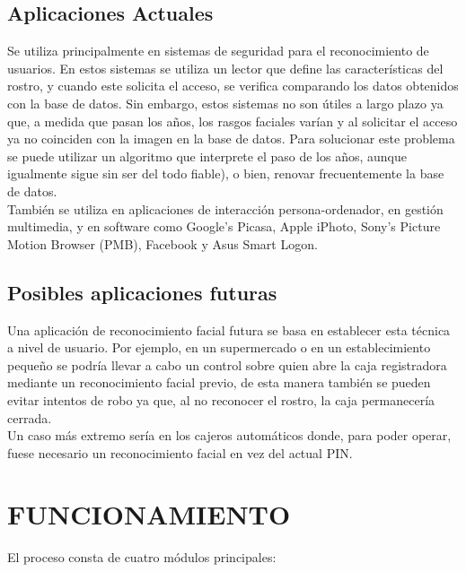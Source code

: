 \documentclass[a4paper,11pt]{article}
\begin{document}
 \subsection{Aplicaciones Actuales}
 Se utiliza principalmente en sistemas de seguridad para el reconocimiento de usuarios. En estos sistemas se utiliza un lector que define las características del rostro, y cuando este solicita el acceso, se verifica comparando los datos obtenidos con la base de datos. Sin embargo, estos sistemas no son útiles a largo plazo ya que, a medida que pasan los años, los rasgos faciales varían y al solicitar el acceso ya no coinciden con la imagen en la base de datos. Para solucionar este problema se puede utilizar un algoritmo que interprete el paso de los años, aunque igualmente sigue sin ser del todo fiable), o bien, renovar frecuentemente la base de datos.	\\
 
 También se utiliza en aplicaciones de interacción persona-ordenador, en gestión multimedia, y en software como Google's Picasa, Apple iPhoto, Sony's Picture Motion Browser (PMB), Facebook y Asus Smart Logon.	\\
 \subsection{Posibles aplicaciones futuras}
 Una aplicación de reconocimiento facial futura se basa en establecer esta técnica a nivel de usuario. Por ejemplo, en un supermercado o en un establecimiento pequeño se podría llevar a cabo un control sobre quien abre la caja registradora mediante un reconocimiento facial previo, de esta manera también se pueden evitar intentos de robo ya que, al no reconocer el rostro, la caja permanecería cerrada. \\Un caso más extremo sería en los cajeros automáticos donde, para poder operar, fuese necesario un reconocimiento facial en vez del actual PIN.
 

 
\section{FUNCIONAMIENTO}
%
El proceso consta de cuatro módulos principales: \\
\end{document}
